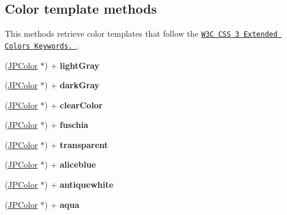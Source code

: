 \subsection*{Color template methods}
\label{_amgrp7b749c2d171ff4698bb077b5c75d4638}
This methods retrieve color templates that follow the \href{http://www.w3.org/TR/css3-color/#svg-color}{\tt W3C CSS 3 Extended Colors Keywords. }. \begin{DoxyCompactItemize}
\item 
\hypertarget{interface_j_p_color_af66a1ea8ebef3b3378b22f0919c12d9c}{
(\hyperlink{interface_j_p_color}{JPColor} $\ast$) + {\bfseries lightGray}}
\label{interface_j_p_color_af66a1ea8ebef3b3378b22f0919c12d9c}

\item 
\hypertarget{interface_j_p_color_addb9e08446fa5092ab0ae6914af70ea1}{
(\hyperlink{interface_j_p_color}{JPColor} $\ast$) + {\bfseries darkGray}}
\label{interface_j_p_color_addb9e08446fa5092ab0ae6914af70ea1}

\item 
\hypertarget{interface_j_p_color_af519c4d0b4a75b857d7c7d940f792f31}{
(\hyperlink{interface_j_p_color}{JPColor} $\ast$) + {\bfseries clearColor}}
\label{interface_j_p_color_af519c4d0b4a75b857d7c7d940f792f31}

\item 
\hypertarget{interface_j_p_color_a164e9e771536daa3b597b1acaf9b0c5d}{
(\hyperlink{interface_j_p_color}{JPColor} $\ast$) + {\bfseries fuschia}}
\label{interface_j_p_color_a164e9e771536daa3b597b1acaf9b0c5d}

\item 
\hypertarget{interface_j_p_color_adf28e4c9016e070cf4813e27c5f0443a}{
(\hyperlink{interface_j_p_color}{JPColor} $\ast$) + {\bfseries transparent}}
\label{interface_j_p_color_adf28e4c9016e070cf4813e27c5f0443a}

\item 
\hypertarget{interface_j_p_color_ae1170c84dbe6a1803b2ef52a218b933e}{
(\hyperlink{interface_j_p_color}{JPColor} $\ast$) + {\bfseries aliceblue}}
\label{interface_j_p_color_ae1170c84dbe6a1803b2ef52a218b933e}

\item 
\hypertarget{interface_j_p_color_a8d43ffe93957038e9a4fee0c6e4fe51a}{
(\hyperlink{interface_j_p_color}{JPColor} $\ast$) + {\bfseries antiquewhite}}
\label{interface_j_p_color_a8d43ffe93957038e9a4fee0c6e4fe51a}

\item 
\hypertarget{interface_j_p_color_a07cf8656cb4fd559544b15cb11334f0c}{
(\hyperlink{interface_j_p_color}{JPColor} $\ast$) + {\bfseries aqua}}
\label{interface_j_p_color_a07cf8656cb4fd559544b15cb11334f0c}


\end{DoxyCompactItemize}
